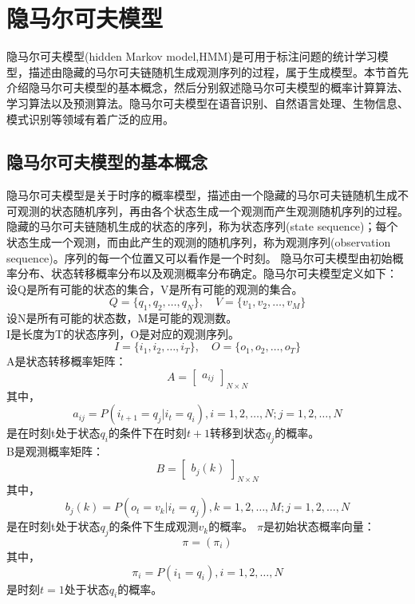 \section{隐马尔可夫模型}
隐马尔可夫模型(hidden Markov model,HMM)是可用于标注问题的统计学习模型，描述由隐藏的马尔可夫链随机生成观测序列的过程，属于生成模型。本节首先介绍隐马尔可夫模型的基本概念，然后分别叙述隐马尔可夫模型的概率计算算法、学习算法以及预测算法。隐马尔可夫模型在语音识别、自然语言处理、生物信息、模式识别等领域有着广泛的应用。
\subsection*{隐马尔可夫模型的基本概念}
隐马尔可夫模型是关于时序的概率模型，描述由一个隐藏的马尔可夫链随机生成不可观测的状态随机序列，再由各个状态生成一个观测而产生观测随机序列的过程。隐藏的马尔可夫链随机生成的状态的序列，称为状态序列(state sequence)；每个状态生成一个观测，而由此产生的观测的随机序列，称为观测序列(observation sequence)。序列的每一个位置又可以看作是一个时刻。
隐马尔可夫模型由初始概率分布、状态转移概率分布以及观测概率分布确定。隐马尔可夫模型定义如下：\\
设Q是所有可能的状态的集合，V是所有可能的观测的集合。
\begin{equation}
	Q=\{q_1,q_2,\dots,q_N\},\quad V=\{v_1,v_2,\dots, v_M\}
\end{equation}
设N是所有可能的状态数，M是可能的观测数。\\
I是长度为T的状态序列，O是对应的观测序列。
\begin{equation}
	I=\{i_1,i_2,\dots, i_T\},\quad O=\{o_1,o_2,\dots,o_T\}
\end{equation}
A是状态转移概率矩阵：
\begin{equation}
	A=\begin{bmatrix} a_{ij} \end{bmatrix}_{N\times N}
\end{equation}
其中，
\begin{equation}
	a_{ij} = P(i_{t+1}=q_j|i_t=q_i),i=1,2,\dots, N;j=1,2,\dots,N
\end{equation}
是在时刻t处于状态$q_i$的条件下在时刻$t+1$转移到状态$q_j$的概率。\\
B是观测概率矩阵：
\begin{equation}
	B=\begin{bmatrix} b_j(k) \end{bmatrix}_{N\times N}
\end{equation}
其中，
\begin{equation}
	b_j(k) = P(o_t=v_k|i_t=q_j),k=1,2,\dots,M;j=1,2,\dots,N
\end{equation}
是在时刻t处于状态$q_j$的条件下生成观测$v_k$的概率。
$\pi$是初始状态概率向量：
\begin{equation}
	\pi = (\pi_i)
\end{equation}
其中，
\begin{equation}
	\pi_i = P(i_1 = q_i),i=1,2,\dots,N
\end{equation}
是时刻$t=1$处于状态$q_i$的概率。

